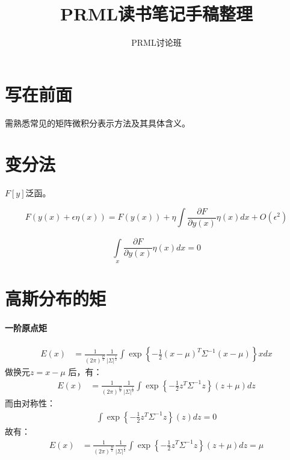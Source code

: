 \documentclass[cn,black,12pt,normal]{elegantnote}
\title{PRML读书笔记手稿整理}
\author{PRML讨论班}
\institute{Tongji University}
\date{\zhtoday}
\begin{document}

\section*{写在前面}

需熟悉常见的矩阵微积分表示方法及其具体含义。

\section{变分法}

$F[y]$泛函。


\begin{equation*}
    F(y(x)+\epsilon \eta(x) ) = F(y(x)) + \eta \int \frac{\partial F}{\partial y(x)}\eta(x) dx + O(\epsilon^2)
\end{equation*}

\begin{equation*}
    \int\limits_{x}^{}  \frac{\partial F}{\partial y(x)}\eta(x) dx = 0
\end{equation*}

\section{高斯分布的矩}

\paragraph{一阶原点矩}

\begin{align*}
    E(x) & = \frac{1}{(2\pi )^{\frac{D }{2} }} \frac{1}{\left | \Sigma  \right |^{\frac{1}{2} }  }\int
    \exp\left \{ -\frac{1}{2} (x-\mu )^T\Sigma^{-1}(x-\mu) \right \}x dx
\end{align*}
做换元$z = x - \mu$ 后，有：
\begin{align*}
    E(x) & = \frac{1}{(2\pi )^{\frac{D }{2} }} \frac{1}{\left | \Sigma  \right |^{\frac{1}{2} }  }\int
    \exp\left \{ -\frac{1}{2} z^T\Sigma^{-1}z \right \}(z+\mu) dz
\end{align*}
而由对称性：
\begin{align*}
    \int \exp\left \{ -\frac{1}{2} z^T\Sigma^{-1}z \right \}(z) dz = 0
\end{align*}
故有：
\begin{align*}
    E(x) & = \frac{1}{(2\pi )^{\frac{D }{2} }} \frac{1}{\left | \Sigma  \right |^{\frac{1}{2} }  }\int
    \exp\left \{ -\frac{1}{2} z^T\Sigma^{-1}z \right \}(z+\mu) dz = \mu
\end{align*}
\end{document}
